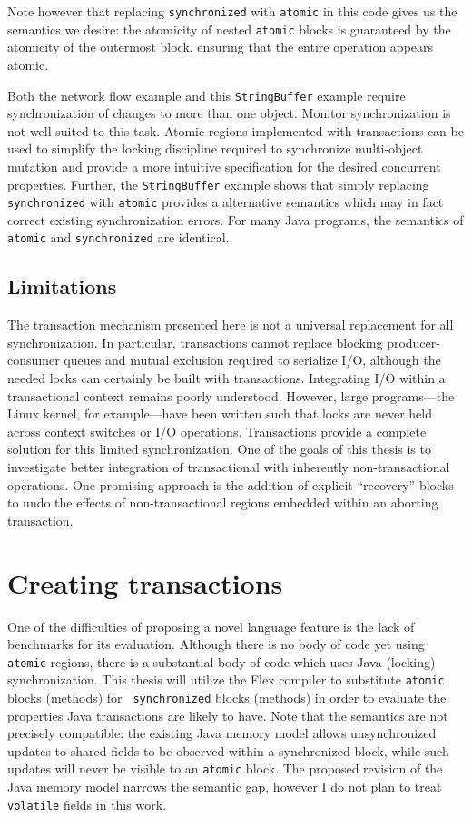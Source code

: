 \documentclass[12pt,twoside]{article}
\newcommand{\note}[1]{}%
\newcommand{\secput}[2]{\section{#2}\label{sec:#1}}
\newcommand{\subsecput}[2]{\subsection{#2}\label{sec:#1}}
\begin{document}
Note however that replacing {\tt synchronized} with {\tt atomic} in
this code gives us the semantics
we desire: the atomicity of nested {\tt atomic} blocks is guaranteed
by the atomicity of the outermost block, ensuring that the entire
operation appears atomic.

Both the network flow example and this {\tt StringBuffer} example require
synchronization of
changes to more than one object.
Monitor synchronization is not
well-suited to this task.  Atomic regions implemented with
transactions can be used to simplify the locking discipline required
to synchronize multi-object mutation
and provide a more intuitive specification for the desired
concurrent properties.  Further, the {\tt StringBuffer} example shows
that simply replacing {\tt synchronized} with {\tt atomic} provides a
alternative semantics which may in fact correct existing
synchronization errors.
For many Java programs, the
semantics of {\tt atomic} and {\tt synchronized} are identical.
\note{Can I make this rigorous?}

\subsecput{xlimit}{Limitations}
The transaction mechanism presented here is not a universal
replacement for all synchronization.  In particular, transactions
cannot replace blocking producer-consumer queues and mutual exclusion
required to serialize I/O, although the needed locks can certainly be
built with transactions.  Integrating I/O within a transactional
context remains poorly understood.  However, large programs---the
Linux kernel, for example---have been written such that locks are
never held across context switches or I/O operations.  Transactions
provide a complete solution for this limited synchronization.
One of the goals of this thesis is to investigate better integration
of transactional with inherently non-transactional operations.
One promising approach is the addition of explicit ``recovery'' blocks
to undo the effects of non-transactional regions embedded within
an aborting transaction.

\secput{auto}{Creating transactions}
One of the difficulties of proposing a novel language feature is the
lack of benchmarks for its evaluation.  Although there is no body of
code yet using {\tt atomic} regions, there is a substantial body of
code which uses Java (locking) synchronization.  This thesis will
utilize the Flex compiler to
substitute {\tt atomic} blocks (methods) for {\tt
  synchronized} blocks (methods) in order to evaluate the properties
Java transactions are likely to have.  Note that the semantics are not
precisely compatible: the existing Java memory model allows
unsynchronized updates to shared fields to be observed within a
synchronized block, while such updates will never be visible to an
{\tt atomic} block.  The proposed revision of the Java memory model
\cite{MansonPu02} narrows the semantic gap, however I do not
plan to treat {\tt volatile} fields in this work.
\end{document}
